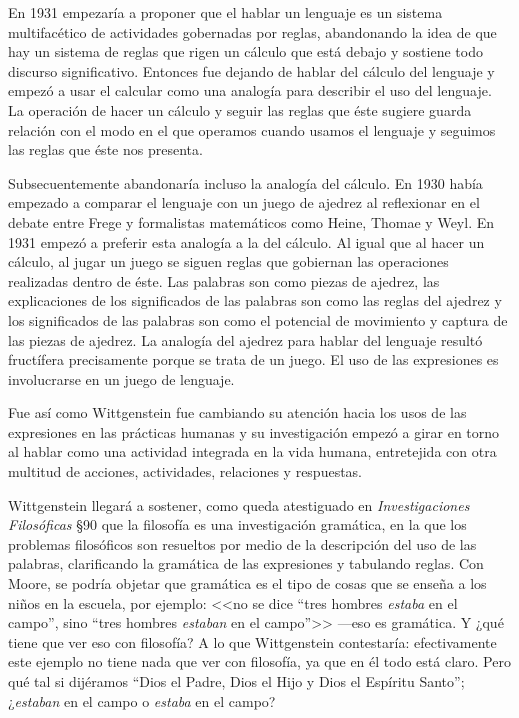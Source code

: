 En 1931 empezaría a proponer que el hablar un lenguaje es un sistema
multifacético de actividades gobernadas por reglas, abandonando la idea de que
hay un sistema de reglas que rigen un cálculo que está debajo y sostiene todo
discurso significativo. Entonces fue dejando de hablar del cálculo del lenguaje
y empezó a usar el calcular como una analogía para describir el uso del
lenguaje. La operación de hacer un cálculo y seguir las reglas que éste sugiere
guarda relación con el modo en el que operamos cuando usamos el lenguaje y
seguimos las reglas que éste nos presenta.

Subsecuentemente abandonaría incluso la analogía del cálculo. En 1930 había
empezado a comparar el lenguaje con un juego de ajedrez al reflexionar en el
debate entre Frege y formalistas matemáticos como Heine, Thomae y
Weyl.\autocite[cf.~][p.134]{rulesngrammar} En 1931 empezó a preferir esta
analogía a la del cálculo. Al igual que al hacer un cálculo, al jugar un juego
se siguen reglas que gobiernan las operaciones realizadas dentro de éste. Las
palabras son como piezas de ajedrez, las explicaciones de los significados de
las palabras son como las reglas del ajedrez y los significados de las palabras
son como el potencial de movimiento y captura de las piezas de ajedrez. La
analogía del ajedrez para hablar del lenguaje resultó fructífera precisamente
porque se trata de un juego. El uso de las expresiones es involucrarse en un
juego de lenguaje.

Fue así como Wittgenstein fue cambiando su atención hacia los usos de las
expresiones en las prácticas humanas y su investigación empezó a girar en torno
al hablar como una actividad integrada en la vida humana, entretejida con otra
multitud de acciones, actividades, relaciones y respuestas.

Wittgenstein llegará a sostener, como queda atestiguado en \emph{Investigaciones
  Filosóficas} \S90 que la filosofía es una investigación gramática, en la que
los problemas filosóficos son resueltos por medio de la descripción del uso de
las palabras, clarificando la gramática de las expresiones y tabulando
reglas\autocite[cf.~][55]{rulesngrammar}. Con Moore, se podría objetar que
gramática es el tipo de cosas que se enseña a los niños en la escuela, por
ejemplo: <<no se dice ``tres hombres \emph{estaba} en el campo'', sino ``tres
hombres \emph{estaban} en el campo''>> ---eso es gramática. Y ¿qué tiene que ver
eso con filosofía? A lo que Wittgenstein contestaría: efectivamente este ejemplo
no tiene nada que ver con filosofía, ya que en él todo está claro. Pero qué tal
si dijéramos ``Dios el Padre, Dios el Hijo y Dios el Espíritu Santo'';
¿\emph{estaban} en el campo o \emph{estaba} en el campo?

